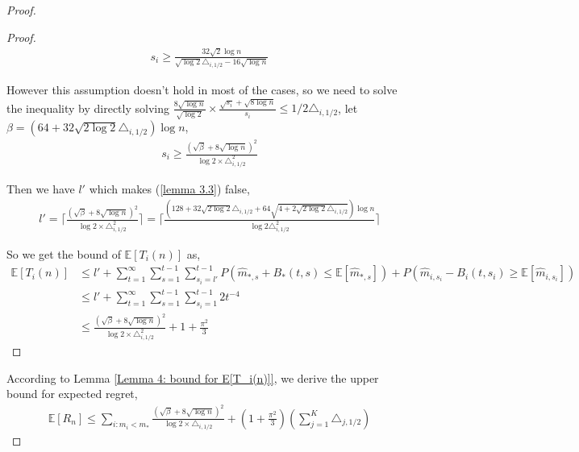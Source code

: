 \documentclass{article}
\theoremstyle{plain}
\begin{document}
\begin{proof}
\begin{proof}
    \begin{align}
        s_i \geq \frac{32 \sqrt{2} \log n}{\sqrt{\log 2} \triangle_{i, 1/2} - 16 \sqrt{\log n}} 
    \end{align}
    
    However this assumption doesn't hold in most of the cases, so we need to solve the inequality by directly solving $\frac{8 \sqrt{\log n}}{\sqrt{\log 2}} \times \frac{\sqrt{s_i} + \sqrt{8\log n}}{s_i} \leq 1/2 \triangle_{i, 1/2}$, let $\beta = (64 + 32 \sqrt{2 \log 2} \triangle_{i,1/2} )\log n$,
    \begin{align}
        s_i \geq \frac{(\sqrt{\beta} + 8 \sqrt{\log n})^2}{\log 2 \times \triangle_{i, 1/2}^2} 
    \end{align}
    
    Then we have $l'$ which makes (\ref{lemma 3.3}) false,
   \begin{align}
       l' = \lceil \frac{(\sqrt{\beta} + 8 \sqrt{\log n})^2}{\log 2 \times \triangle_{i, 1/2}^2} \rceil = \lceil \frac{(128 + 32 \sqrt{2 \log 2} \triangle_{i, 1/2} + 64 \sqrt{4 + 2 \sqrt{2 \log 2} \triangle_{i, 1/2}}) \log n}{\log 2 \triangle_{i, 1/2}^2} \rceil
   \end{align} 
   
    So we get the bound of $\mathbb{E}[T_i(n)]$ as,
    \begin{align}
        \mathbb{E}[T_i(n)] &\leq l' + \sum_{t = 1}^\infty \sum_{s = 1}^{t-1} \sum_{s_i = l'}^{t-1} P(\hat{m}_{*, s} + B_*(t, s) \leq  \mathbb{E}[\hat{m}_{*, s}]) + P(\hat{m}_{i, s_i} - B_i(t, s_i) \geq \mathbb{E}[\hat{m}_{i, s_i}])\\
        & \leq l' + \sum_{t = 1}^\infty \sum_{s = 1}^{t-1} \sum_{s_i = 1}^{t-1} 2 t^{-4}\\
        & \leq \frac{(\sqrt{\beta} + 8 \sqrt{\log n})^2}{\log 2 \times \triangle_{i, 1/2}^2} + 1 + \frac{\pi^2}{3}
    \end{align}
   
\end{proof}

According to Lemma \ref{Lemma 4: bound for E[T_i(n)]}, we derive the upper bound for expected regret,
\begin{align}
    \mathbb{E}[R_n] \leq 
          \sum_{i: m_i < m_\ast} \frac{(\sqrt{\beta} + 8 \sqrt{\log n})^2}{\log 2 \times \triangle_{i, 1/2}} + (1 + \frac{\pi^2}{3}) (\sum_{j=1}^K \triangle_{j, 1/2}) 
\end{align}
   
\end{proof}
\end{document}
